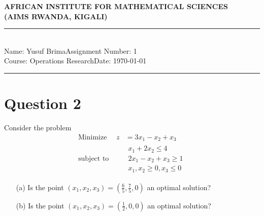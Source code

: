 \documentclass[12pt,a4paper]{article}
\newcommand{\student}{Yusuf Brima}
\newcommand{\course}{Operations Research}
\newcommand{\assignment}{1}
\begin{document}
\thispagestyle{empty}
\begin{center}
\textbf{AFRICAN INSTITUTE FOR MATHEMATICAL SCIENCES \\[0.5cm]
(AIMS RWANDA, KIGALI)}
\vspace{1.0cm}
\end{center}

\noindent
\rule{17cm}{0.2cm}\\[0.3cm]
Name: \student \hfill Assignment Number: \assignment\\[0.1cm]
Course: \course \hfill Date: \today\\
\rule{17cm}{0.05cm}
\vspace{1.0cm}
\section*{Question 2}
Consider the problem
\begin{equation}
    \begin{aligned}
    \text{Minimize } \quad    z &= 3x_1 - x_2 + x_3 \\
    \text{subject to }\quad &
        \begin{array}{c}
            x_1 +2 x_2 \leq 4 \\
           2 x_1 - x_2 + x_3 \geq 1 \\
            x_1,x_2 \geq 0, x_3 \leq 0
        \end{array}
    \end{aligned}
    \label{eq:problem_2}
\end{equation}
\begin{enumerate}
	\item[(a)] Is the point $(x_1, x_2, x_3) = (\frac{6}{5}, \frac{7}{5}, 0)$ an optimal solution?
	\item[(b)] Is the point $(x_1, x_2, x_3) = (\frac{1}{2}, 0, 0)$ an optimal solution?
\end{enumerate}
\end{document}
